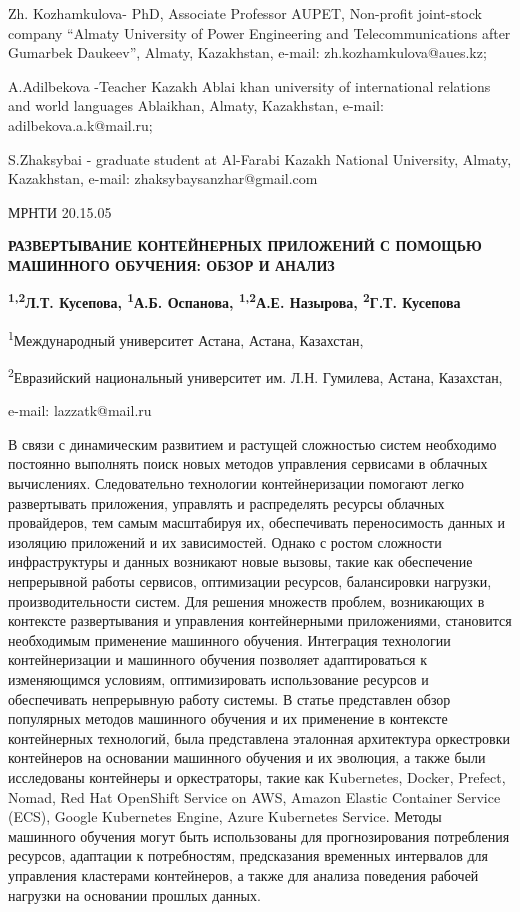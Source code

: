 Zh. Kozhamkulova- PhD, Associate Professor AUPET, Non-profit joint-stock
company ``Almaty University of Power Engineering and Telecommunications
after Gumarbek Daukeev'', Almaty, Kazakhstan, e-mail:
zh.kozhamkulova@aues.kz;

A.Adilbekova -Teacher Kazakh Ablai khan university of international
relations and world languages Ablaikhan, Almaty, Kazakhstan, e-mail:
adilbekova.a.k@mail.ru;

S.Zhaksybai - graduate student at Al-Farabi Kazakh National University,
Almaty, Kazakhstan, e-mail: zhaksybaysanzhar@gmail.com

МРНТИ 20.15.05

\textbf{РАЗВЕРТЫВАНИЕ КОНТЕЙНЕРНЫХ ПРИЛОЖЕНИЙ С ПОМОЩЬЮ МАШИННОГО
ОБУЧЕНИЯ: ОБЗОР И АНАЛИЗ}

\textbf{\textsuperscript{1,2}Л.Т. Кусепова, \textsuperscript{1}А.Б.
Оспанова, \textsuperscript{1,2}А.Е. Назырова, \textsuperscript{2}Г.Т.
Кусепова}

\textsuperscript{1}Международный университет Астана, Астана, Казахстан,

\textsuperscript{2}Евразийский национальный университет им. Л.Н.
Гумилева, Астана, Казахстан,

e-mail: lazzatk@mail.ru

В связи с динамическим развитием и растущей сложностью систем необходимо
постоянно выполнять поиск новых методов управления сервисами в облачных
вычислениях. Следовательно технологии контейнеризации помогают легко
развертывать приложения, управлять и распределять ресурсы облачных
провайдеров, тем самым масштабируя их, обеспечивать переносимость данных
и изоляцию приложений и их зависимостей. Однако с ростом сложности
инфраструктуры и данных возникают новые вызовы, такие как обеспечение
непрерывной работы сервисов, оптимизации ресурсов, балансировки
нагрузки, производительности систем. Для решения множеств проблем,
возникающих в контексте развертывания и управления контейнерными
приложениями, становится необходимым применение машинного обучения.
Интеграция технологии контейнеризации и машинного обучения позволяет
адаптироваться к изменяющимся условиям, оптимизировать использование
ресурсов и обеспечивать непрерывную работу системы. В статье представлен
обзор популярных методов машинного обучения и их применение в контексте
контейнерных технологий, была представлена эталонная архитектура
оркестровки контейнеров на основании машинного обучения и их эволюция, а
также были исследованы контейнеры и оркестраторы, такие как Kubernetes,
Docker, Prefect, Nomad, Red Hat OpenShift Service on AWS, Amazon Elastic
Container Service (ECS), Google Kubernetes Engine, Azure Kubernetes
Service. Методы машинного обучения могут быть использованы для
прогнозирования потребления ресурсов, адаптации к потребностям,
предсказания временных интервалов для управления кластерами контейнеров,
а также для анализа поведения рабочей нагрузки на основании прошлых
данных.

